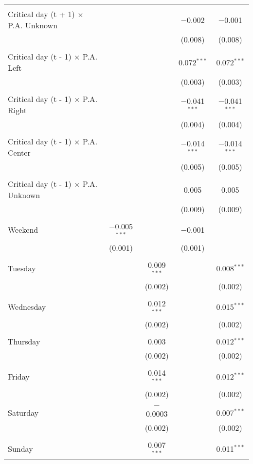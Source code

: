 \documentclass[
]{article}
\begin{document}
\begin{table}[!htbp]
{\begin{tabular}{@{\extracolsep{5pt}}lcccc}
  & & & & \\ 
 Critical day (t + 1) $\times$ P.A. Unknown &  &  & $-$0.002 & $-$0.001 \\ 
  &  &  & (0.008) & (0.008) \\ 
  & & & & \\ 
 Critical day (t - 1) $\times$ P.A. Left &  &  & 0.072$^{***}$ & 0.072$^{***}$ \\ 
  &  &  & (0.003) & (0.003) \\ 
  & & & & \\ 
 Critical day (t - 1) $\times$ P.A. Right &  &  & $-$0.041$^{***}$ & $-$0.041$^{***}$ \\ 
  &  &  & (0.004) & (0.004) \\ 
  & & & & \\ 
 Critical day (t - 1) $\times$ P.A. Center &  &  & $-$0.014$^{***}$ & $-$0.014$^{***}$ \\ 
  &  &  & (0.005) & (0.005) \\ 
  & & & & \\ 
 Critical day (t - 1) $\times$ P.A. Unknown &  &  & 0.005 & 0.005 \\ 
  &  &  & (0.009) & (0.009) \\ 
  & & & & \\ 
 Weekend & $-$0.005$^{***}$ &  & $-$0.001 &  \\ 
  & (0.001) &  & (0.001) &  \\ 
  & & & & \\ 
 Tuesday &  & 0.009$^{***}$ &  & 0.008$^{***}$ \\ 
  &  & (0.002) &  & (0.002) \\ 
  & & & & \\ 
 Wednesday &  & 0.012$^{***}$ &  & 0.015$^{***}$ \\ 
  &  & (0.002) &  & (0.002) \\ 
  & & & & \\ 
 Thursday &  & 0.003 &  & 0.012$^{***}$ \\ 
  &  & (0.002) &  & (0.002) \\ 
  & & & & \\ 
 Friday &  & 0.014$^{***}$ &  & 0.012$^{***}$ \\ 
  &  & (0.002) &  & (0.002) \\ 
  & & & & \\ 
 Saturday &  & $-$0.0003 &  & 0.007$^{***}$ \\ 
  &  & (0.002) &  & (0.002) \\ 
  & & & & \\ 
 Sunday &  & 0.007$^{***}$ &  & 0.011$^{***}$ \\ 

\end{tabular}}
\end{table}
\end{document}
